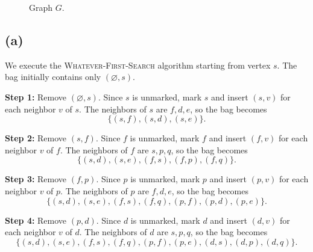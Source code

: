 \documentclass{brockcosc3p03}
\begin{document}
\begin{figure}[H]
\centering
{}
\caption{Graph $G$.}
\label{fig:q2-graph}
\end{figure}

\subsection*{(a)}

We execute the \textsc{Whatever-First-Search} algorithm starting from vertex $s$.
The bag initially contains only $(\varnothing,s)$.

\textbf{Step 1:} Remove $(\varnothing,s)$. Since $s$ is unmarked, mark $s$ and insert
$(s,v)$ for each neighbor $v$ of $s$.
The neighbors of $s$ are $f,d,e$, so the bag becomes
\[
\{(s,f),(s,d),(s,e)\}.
\]

\textbf{Step 2:} Remove $(s,f)$. Since $f$ is unmarked, mark $f$ and insert
$(f,v)$ for each neighbor $v$ of $f$.
The neighbors of $f$ are $s,p,q$, so the bag becomes
\[
\{(s,d),(s,e),(f,s),(f,p),(f,q)\}.
\]

\textbf{Step 3:} Remove $(f,p)$. Since $p$ is unmarked, mark $p$ and insert
$(p,v)$ for each neighbor $v$ of $p$.
The neighbors of $p$ are $f,d,e$, so the bag becomes
\[
\{(s,d),(s,e),(f,s),(f,q),(p,f),(p,d),(p,e)\}.
\]

\textbf{Step 4:} Remove $(p,d)$. Since $d$ is unmarked, mark $d$ and insert
$(d,v)$ for each neighbor $v$ of $d$.
The neighbors of $d$ are $s,p,q$, so the bag becomes
\[
\{(s,d),(s,e),(f,s),(f,q),(p,f),(p,e),(d,s),(d,p),(d,q)\}.
\]
\end{document}
